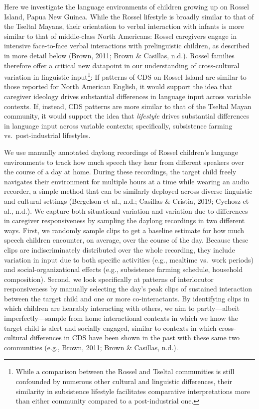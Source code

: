 \documentclass[
  english,
  ,man,floatsintext]{apa6}
\begin{document}
Here we investigate the language environments of children growing up on Rossel Island, Papua New Guinea. While the Rossel lifestyle is broadly similar to that of the Tseltal Mayans, their orientation to verbal interaction with infants is more similar to that of middle-class North Americans: Rossel caregivers engage in intensive face-to-face verbal interactions with prelinguistic children, as described in more detail below (Brown, 2011; Brown \& Casillas, n.d.). Rossel families therefore offer a critical new datapoint in our understanding of cross-cultural variation in linguistic input\footnote{While a comparison between the Rossel and Tseltal communities is still confounded by numerous other cultural and linguistic differences, their similarity in subsistence lifestyle facilitates comparative interpretations more than either community compared to a post-industrial one.}: If patterns of CDS on Rossel Island are similar to those reported for North American English, it would support the idea that caregiver ideology drives substantial differences in language input across variable contexts. If, instead, CDS patterns are more similar to that of the Tseltal Mayan community, it would support the idea that \emph{lifestyle} drives substantial differences in language input across variable contexts; specifically, subsistence farming vs.~post-industrial lifestyles.

We use manually annotated daylong recordings of Rossel children's language environments to track how much speech they hear from different speakers over the course of a day at home. During these recordings, the target child freely navigates their environment for multiple hours at a time while wearing an audio recorder, a simple method that can be similarly deployed across diverse linguistic and cultural settings (Bergelson et al., n.d.; Casillas \& Cristia, 2019; Cychosz et al., n.d.). We capture both situational variation and variation due to differences in caregiver responsiveness by sampling the daylong recordings in two different ways. First, we randomly sample clips to get a baseline estimate for how much speech children encounter, on average, over the course of the day. Because these clips are indiscriminately distributed over the whole recording, they include variation in input due to both specific activities (e.g., mealtime vs.~work periods) and social-organizational effects (e.g., subsistence farming schedule, household composition). Second, we look specifically at patterns of interlocutor responsiveness by manually selecting the day's peak clips of sustained interaction between the target child and one or more co-interactants. By identifying clips in which children are hearably interacting with others, we aim to partly---albeit imperfectly---sample from home interactional contexts in which we know the target child is alert and socially engaged, similar to contexts in which cross-cultural differences in CDS have been shown in the past with these same two communities (e.g., Brown, 2011; Brown \& Casillas, n.d.).
\end{document}
